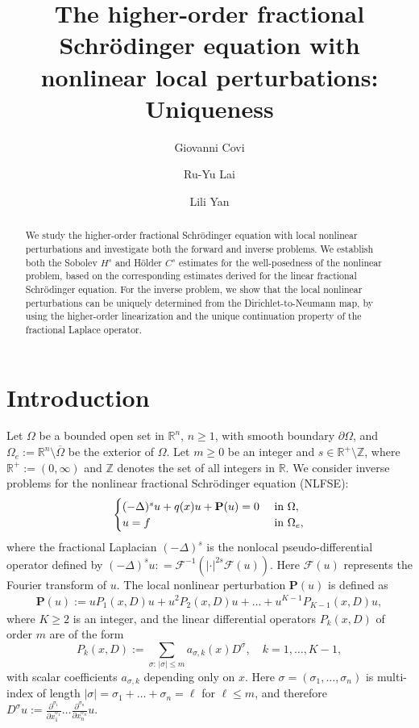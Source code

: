 \documentclass [oneside,11pt] {amsart}
\author[G. Covi]{Giovanni Covi}
\author[R.-Y. Lai]{Ru-Yu Lai}
\author[L. Yan]{Lili Yan}
\numberwithin{equation}{section}
\newcommand{\R}{\mathbb{R}}
\newcommand{\p}{\partial}
\begin{document}
\title[]{The higher-order fractional Schr\"odinger equation with nonlinear local perturbations: Uniqueness}


\begin{abstract}
We study the higher-order fractional Schr\"odinger equation with local nonlinear perturbations and investigate both the forward and inverse problems. We establish both the Sobolev $H^s$ and H\"older $C^s$ estimates for the well-posedness of the nonlinear problem, based on the corresponding estimates derived for the linear fractional Schr\"odinger equation. For the inverse problem, we show that the local nonlinear perturbations can be uniquely determined from the Dirichlet-to-Neumann map, by using the higher-order linearization and the unique continuation property of the fractional Laplace operator. 
\end{abstract}

\maketitle

\tableofcontents

\section{Introduction}

Let $\Omega$ be a bounded open set in $\R^n$, $n\geq 1$, with smooth boundary $\p\Omega$, and 
$\Omega_e := \R^n\setminus \overline\Omega$ be the exterior of $\Omega$. 
Let $m\geq 0$ be an integer and $s\in \R^+\setminus \mathbb{Z}$, where $\R^+:=(0,\infty)$ and $\mathbb{Z}$ denotes the set of all integers in $\R$.  
We consider inverse problems for the nonlinear fractional Schr\"odinger equation (NLFSE):
\begin{equation}\label{eq_1_IBVP}
\begin{cases}
(-\Delta)^su + q(x)u +\mathbf{P}(u)= 0 &\hbox{ in } \Omega,\\
u = f &\hbox{ in } \Omega_e,
\end{cases}
\end{equation}
where the fractional Laplacian $(-\Delta)^s$ is the nonlocal pseudo-differential operator defined by $(-\Delta)^su: = \mathcal{F}^{-1}(|\cdot|^{2s}\mathcal{F}(u))$. Here $\mathcal{F} (u)$ represents the Fourier transform of $u$.  
The local nonlinear perturbation $\mathbf{P} (u)$ is defined as 
\begin{align}\label{DEF:nonlinear P}
\mathbf{P} (u) := uP_1(x,D)u + u^2 P_2(x,D)u+\ldots+u^{K-1}P_{K-1}(x,D)u,
\end{align}
where $K\geq 2$ is an integer, and the linear differential operators $P_k(x,D)$ of order $m$ are of the form
$$
P_k(x,D):=\sum_{\sigma: \,|\sigma|\leq m}a_{\sigma,k}(x)D^\sigma,\quad k=1,\ldots,K-1,
$$
with scalar coefficients $a_{\sigma,k}$ depending only on $x$. Here $\sigma=(\sigma_1,\ldots,\sigma_n)$ is multi-index of length $|\sigma|=\sigma_1+\ldots+\sigma_n=\ell$ for $\ell\leq m$, and therefore $D^\sigma u := \frac{\p^{\sigma_1}}{\p x_1^{\sigma_1}}\ldots\frac{\p^{\sigma_n}}{\p x_n^{\sigma_n}}  u$. \\
\end{document}

